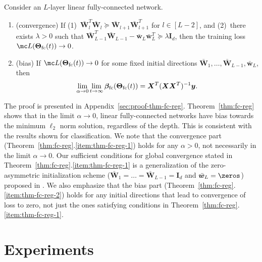 \documentclass{article} %
\def\vw{{\bm{w}}}
\def\vy{{\bm{y}}}
\def\mI{{\bm{I}}}
\def\mW{{\bm{W}}}
\def\mX{{\bm{X}}}
\newcommand{\vbeta}{{\bm{\beta}}}
\newcommand{\vbetafc}{\vbeta_{\rm fc}}
\newcommand{\bTheta}{\bm{\Theta}}
\newcommand{\bThetafc}{\bTheta_{\rm fc}}
\begin{document}
\begin{theorem}
\label{thm:fc-reg}
Consider an $L$-layer linear fully-connected network.
\begin{enumerate}[leftmargin=0.5cm]
	\item \label{item:thm-fc-reg-1} (convergence) If (1)~$\bar \mW_l^T \bar \mW_l \succeq \bar \mW_{l+1} \bar \mW_{l+1}^T$ for $l \in [L-2]$, and (2)~there exists $\lambda > 0$ such that $\bar \mW_{L-1}^T \bar \mW_{L-1} - \bar \vw_L \bar \vw_L^T \succeq \lambda \mI_d$, then the training loss $\mc L(\bThetafc(t)) \to 0$.
	\item \label{item:thm-fc-reg-2} (bias) If $\mc L(\bThetafc(t)) \to 0$ for some fixed initial directions $\bar \mW_1, \dots, \bar \mW_{L-1}, \bar \vw_L$, then
	\begin{equation*}
		\lim_{\alpha \to 0} \lim_{t \to \infty} \vbetafc(\bThetafc(t)) = \mX^T (\mX \mX^T)^{-1} \vy.
	\end{equation*}
\end{enumerate}
\end{theorem}
The proof is presented in Appendix~\ref{sec:proof-thm-fc-reg}.
Theorem~\ref{thm:fc-reg} shows that in the limit $\alpha \to 0$, linear fully-connected networks have bias towards the minimum $\ell_2$ norm solution, regardless of the depth. This is consistent with the results shown for classification. We note that the convergence part (Theorem~\ref{thm:fc-reg}.\ref{item:thm-fc-reg-1}) holds for any $\alpha > 0$, not necessarily in the limit $\alpha \to 0$. Our sufficient conditions for global convergence stated in Theorem~\ref{thm:fc-reg}.\ref{item:thm-fc-reg-1} is a generalization of the zero-asymmetric initialization scheme ($\bar \mW_1 = \dots = \bar \mW_{L-1} = \mI_d$ and $\bar \vw_L = \zeros$) proposed in \citet{wu2019global}.
We also emphasize that the bias part (Theorem~\ref{thm:fc-reg}.\ref{item:thm-fc-reg-2}) holds for any initial directions that lead to convergence of loss to zero, not just the ones satisfying conditions in Theorem~\ref{thm:fc-reg}.\ref{item:thm-fc-reg-1}.

\section{Experiments}
\label{sec:exp}
\end{document}
